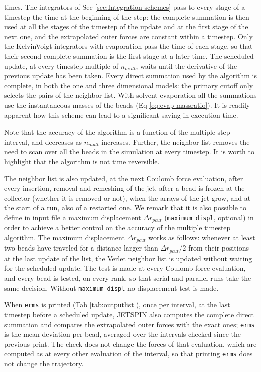 times. The integrators of Sec \ref{sec:Integration-schemes} pass to
every stage of a timestep the time at the beginning of the step: the
complete summation is then used at all the stages of the timestep of
the update and at the first stage of the next one, and the extrapolated
outer forces are constant within a timestep. Only the Kelvin\textendash Voigt
integrators with evaporation pass the time of each stage, so that their
second complete summation is the first stage at a later time. The scheduled
update, at every timestep multiple of $n_{mult}$, waits until the
derivative of the previous update has been taken. Every direct summation
used by the algorithm is complete, in both the one and three dimensional
models: the primary cutoff only selects the pairs of the neighbor list.
With solvent evaporation all the summations use the instantaneous
masses of the beads (Eq \ref{eq:evap-massratio}). It is readily apparent
how this scheme can lead to a significant saving in execution time.

Note that the accuracy of the algorithm is a function of the multiple
step interval, and decreases as $n_{mult}$ increases. Further, the
neighbor list removes the need to scan over all the beads in the simulation
at every timestep. It is worth to highlight that the algorithm is
not time reversible.

The neighbor list is also updated, at the next Coulomb force evaluation,
after every insertion, removal and remeshing of the jet, after a bead
is frozen at the collector (whether it is removed or not), when the
arrays of the jet grow, and at the start of a run, also of a restarted
one. We remark that it is also possible to define in input file a maximum
displacement $\Delta r_{pcut}$ (\texttt{maximum displ}, optional) in
order to achieve a better control on the accuracy of the multiple timestep
algorithm. The maximum displacement $\Delta r_{pcut}$ works as follows:
whenever at least two beads have traveled for a distance larger than
$\Delta r_{pcut}/2$ from their positions at the last update of the
list, the Verlet neighbor list is updated without waiting for the
scheduled update.
The test is made at every Coulomb force evaluation, and every bead
is tested, on every rank, so that serial and parallel runs take the
same decision. Without \texttt{maximum displ} no displacement test
is made.

When \texttt{erms} is printed (Tab \ref{tab:outputlist}), once per
interval, at the last timestep before a scheduled update, JETSPIN also
computes the complete direct summation and compares the extrapolated
outer forces with the exact ones; \texttt{erms} is the mean deviation
per bead, averaged over the intervals checked since the previous print. The
check does not change the forces of that evaluation, which are computed
as at every other evaluation of the interval, so that printing \texttt{erms}
does not change the trajectory.

